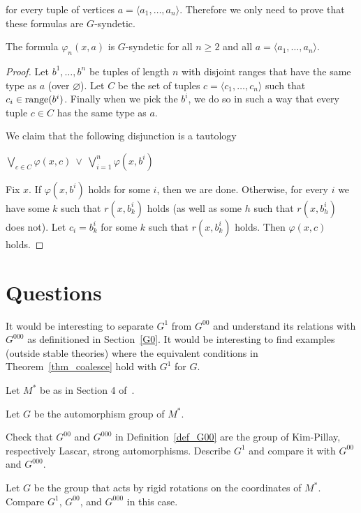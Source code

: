 
for every tuple of vertices $a=\langle a_1,\dots,a_n\rangle$. 
Therefore we only need to prove that these formulas are $G$-syndetic.

\begin{theorem}
  The formula $\varphi_n(x,a)$ is $G$-syndetic for all $n\ge 2$ and all $a=\langle a_1,\ldots,a_n\rangle$.
\end{theorem}

\begin{proof}
  Let $b^1,\ldots,b^n$ be tuples of length $n$ with disjoint ranges that have the same type as $a$ (over $\varnothing$). Let $C$ be the set of tuples $c=\langle c_1,\ldots,c_n\rangle$ such that $c_i\in{\rm range}(b^i)$.
  Finally when we pick the $b^i$, we do so in such a way that every tuple $c\in C$ has the same type as $a$.

  We claim that the following disjunction is a tautology

  \hfil$\displaystyle\bigvee_{c\in C}\varphi(x,c)\ \vee\ \bigvee_{i=1}^n \varphi(x,b^i)$

  Fix $x$.
  If $\varphi(x,b^i)$ holds for some $i$, then we are done.
  Otherwise, for every $i$ we have some $k$ such that $r(x,b^i_k)$ holds (as well as some $h$ such that $r(x,b^i_h)$ does not).
  Let $c_i=b^i_k$ for some $k$ such that $r(x,b^i_k)$ holds.
  Then $\varphi(x,c)$ holds.
\end{proof}

\section{Questions}

It would be interesting to separate $G^1$ from $G^{00}$ and understand its relations with $G^{000}$ as definitioned in Section~\ref{G0}.
It would be interesting to find examples (outside stable theories) where the equivalent conditions in Theorem~\ref{thm_coalesce} hold with $G^1$ for $G$.

Let $M^*$ be as in Section 4 of~\cite{CLPZ}. 

\begin{question}
  Let $G$ be the automorphism group of $M^*$.

  Check that $G^{00}$ and $G^{000}$ in Definition~\ref{def_G00} are the group of Kim-Pillay, respectively Lascar, strong automorphisms.
  Describe $G^1$ and compare it with $G^{00}$ and $G^{000}$.
\end{question}

\begin{question}
  Let $G$ be the group that acts by rigid rotations on the coordinates of $M^*$.
  Compare $G^1$, $G^{00}$, and $G^{000}$ in this case.
\end{question}

